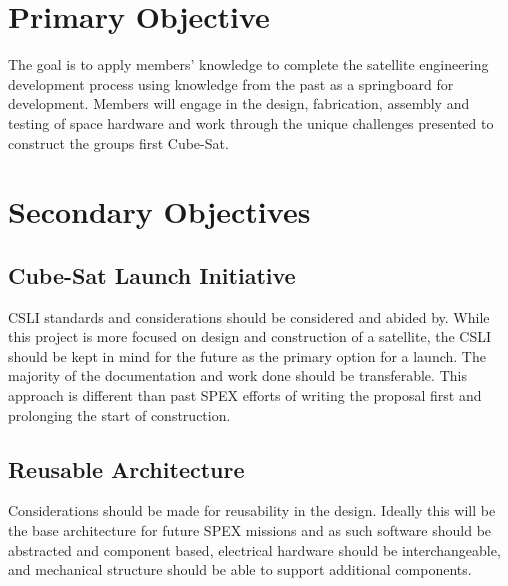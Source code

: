\documentclass[conference]{IEEEtran} %
\begin{document}
\section{Primary Objective}
\label{sec:primary-obj}

The goal is to apply members' knowledge to complete the satellite engineering development process using knowledge from the past as a springboard for development.
Members will engage in the design, fabrication, assembly and testing of space hardware and work through the unique challenges presented to construct the groups first Cube-Sat.






\section{Secondary Objectives}
\label{sec:primary-obj}
\subsection{Cube-Sat Launch Initiative}
CSLI standards and considerations should be considered and abided by.  While this project is more focused on design and construction of a satellite, the CSLI should be kept in mind for the future as the primary option for a launch.  The majority of the documentation and work done should be transferable.  This approach is different than past SPEX efforts of writing the proposal first and prolonging the start of construction.

\subsection{Reusable Architecture}
Considerations should be made for reusability in the design.  Ideally this will be the base architecture for future SPEX missions and as such software should be abstracted and component based, electrical hardware should be interchangeable, and mechanical structure should be able to support additional components.
\end{document}
